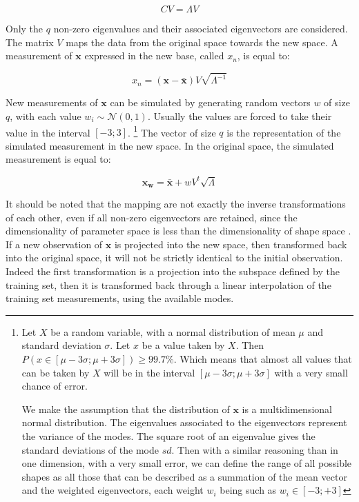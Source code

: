 \begin{equation}
	CV = \Lambda V
\end{equation}

Only the $q$ non-zero eigenvalues and their associated eigenvectors are considered. The matrix $V$ maps the data from the original space towards the new space.%
A measurement of $\mathbf{x}$ expressed in the new base, called $x_n$, is equal to: 

\begin{equation}
	x_n = (\mathbf{x} - \bar{\mathbf{x}}) V \sqrt{\Lambda^{-1}}
\end{equation}




New measurements of $\mathbf{x}$ can be simulated by generating random vectors $w$ of size $q$, with each value $w_i \sim \mathcal{N}(0,1)$. Usually the values are forced to take their value in the interval $[-3; 3]$.
	\footnote{Let $X$ be a random variable, with a normal distribution of mean $\mu$ and standard deviation $\sigma$. Let $x$ be a value taken by $X$. Then $P(x \in [\mu -3 \sigma ; \mu +3 \sigma]) \geq 99.7\%$. Which means that almost all values that can be taken by $X$ will be in the interval $[\mu - 3\sigma ; \mu + 3\sigma]$ with a very small chance of error.
	
	We make the assumption that the distribution of $\mathbf{x}$ is a multidimensional normal distribution. The eigenvalues associated to the eigenvectors represent the variance of the modes. The square root of an eigenvalue gives the standard deviations of the mode $sd$. Then with a similar reasoning than in one dimension, with a very small error, we can define the range of all possible shapes as all those that can be described as a summation of the mean vector and the weighted eigenvectors, each weight $w_i$ being such as $w_i \in [-3; +3]$}
 The vector of size $q$ is the representation of the simulated measurement in the new space. In the original space, the simulated measurement is equal to:

\begin{equation}
	\mathbf{x_w} = \bar{\mathbf{x}} + wV^t\sqrt{\Lambda}
	\label{eq:pca_new_shape}
\end{equation}

It should be noted that the mapping are not exactly the inverse transformations of each other, even if all non-zero eigenvectors are retained, since the dimensionality of parameter space is less than the dimensionality of shape space \cite{davies_2008_statistical}. If a new observation of $\mathbf{x}$ is projected into the new space, then transformed back into the original space, it will not be strictly identical to the initial observation. Indeed the first transformation is a projection into the subspace defined by the training set, then it is transformed back through a linear interpolation of the training set measurements, using the available modes. 


